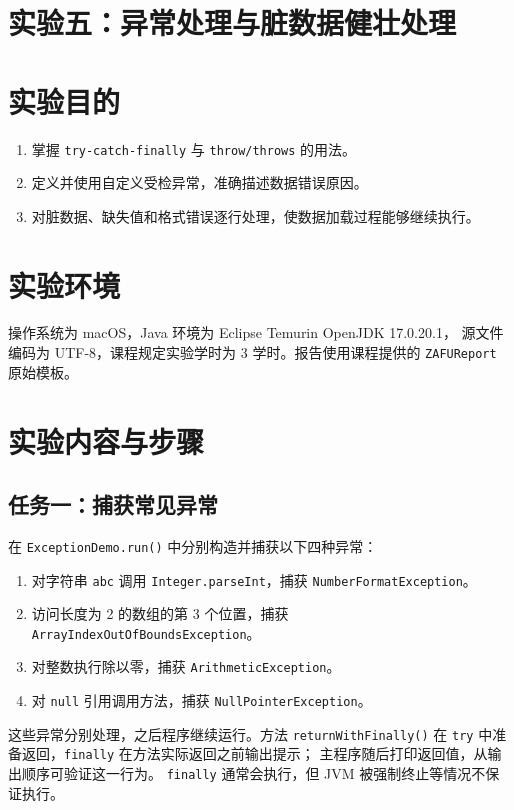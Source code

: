 \section*{实验五：异常处理与脏数据健壮处理}

\section{实验目的}
\begin{enumerate}
  \item 掌握 \texttt{try-catch-finally} 与 \texttt{throw/throws} 的用法。
  \item 定义并使用自定义受检异常，准确描述数据错误原因。
  \item 对脏数据、缺失值和格式错误逐行处理，使数据加载过程能够继续执行。
\end{enumerate}

\section{实验环境}
操作系统为 macOS，Java 环境为 Eclipse Temurin OpenJDK 17.0.20.1，
源文件编码为 UTF-8，课程规定实验学时为 3 学时。报告使用课程提供的
\texttt{ZAFUReport} 原始模板。

\section{实验内容与步骤}
\subsection{任务一：捕获常见异常}
在 \texttt{ExceptionDemo.run()} 中分别构造并捕获以下四种异常：
\begin{enumerate}
  \item 对字符串 \texttt{abc} 调用 \texttt{Integer.parseInt}，捕获 \texttt{NumberFormatException}。
  \item 访问长度为 2 的数组的第 3 个位置，捕获 \texttt{ArrayIndexOutOfBoundsException}。
  \item 对整数执行除以零，捕获 \texttt{ArithmeticException}。
  \item 对 \texttt{null} 引用调用方法，捕获 \texttt{NullPointerException}。
\end{enumerate}
这些异常分别处理，之后程序继续运行。方法 \texttt{returnWithFinally()} 在
\texttt{try} 中准备返回，\texttt{finally} 在方法实际返回之前输出提示；
主程序随后打印返回值，从输出顺序可验证这一行为。
\texttt{finally} 通常会执行，但 JVM 被强制终止等情况不保证执行。

